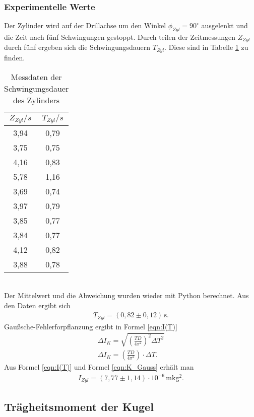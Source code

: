 \subsubsection{Experimentelle Werte}
Der Zylinder wird auf der Drillachse um den Winkel $\phi_{Zyl} = 90^{\circ}$ ausgelenkt und die Zeit
nach fünf Schwingungen gestoppt.
Durch teilen der Zeitmessungen $Z_{Zyl}$ durch fünf ergeben sich die Schwingungsdauern $T_{Zyl}$. 
Diese sind in Tabelle \ref{tab:T_Zyl} zu finden.
\begin{table}
  \centering
  \caption{Messdaten der Schwingungsdauer des Zylinders}
  \label{tab:T_Zyl}
  \begin{tabular}{c c}
    \toprule
    $Z_{Zyl}/s$ & $T_{Zyl}/s$ \\
    \midrule
    3,94 & 0,79 \\
    3,75 & 0,75 \\
    4,16 & 0,83 \\
    5,78 & 1,16 \\
    3,69 & 0,74 \\
    3,97 & 0,79 \\
    3,85 & 0,77 \\
    3,84 & 0,77 \\
    4,12 & 0,82 \\
    3,88 & 0,78 \\
    \bottomrule
  \end{tabular}
\end{table}
\\
Der Mittelwert und die Abweichung wurden wieder mit Python berechnet.
Aus den Daten ergibt sich
\begin{align*}
  T_{Zyl} = (0{,}82 \pm 0{,}12)\, \mathrm{s} .
\end{align*}
Gaußsche-Fehlerforpflanzung ergibt in Formel \ref{eqn:I(T)}
\begin{align}
  \label{eqn:K_Gauss}
  \Delta I_{K} = \sqrt{\left(\frac{TD}{4\pi^2}\right)^2 \Delta T^2} \nonumber \\
  \Delta I_{K} = \left(\frac{TD}{4\pi^2}\right) \cdot \Delta T.
\end{align}
Aus Formel \ref{eqn:I(T)} und Formel \ref{eqn:K_Gauss} erhält man
\begin{align*}
  I_{Zyl} = (7{,}77 \pm 1{,}14)\cdot 10^{-6}\, \mathrm{mkg^2}.
\end{align*}

\subsection{Trägheitsmoment der Kugel}

